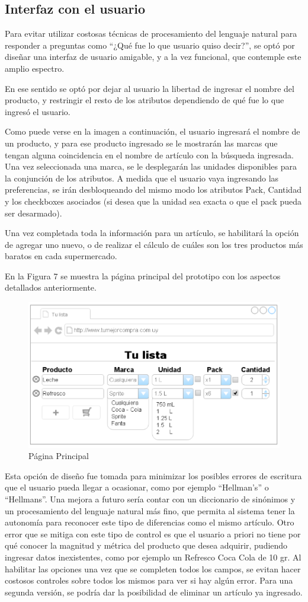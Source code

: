 \documentclass[12pt]{article} %
\begin{document}

\subsection{Interfaz con el usuario}
Para evitar utilizar costosas técnicas de procesamiento del lenguaje natural para responder a preguntas como “¿Qué fue lo que usuario quiso decir?”, se optó por diseñar una interfaz de usuario amigable, y a la vez funcional, que contemple este amplio espectro. 

En ese sentido se optó por dejar al usuario la libertad de ingresar el nombre del producto, y restringir el resto de los atributos dependiendo de qué fue lo que ingresó el usuario.

Como puede verse en la imagen a continuación, el usuario ingresará el nombre de un producto, y para ese producto ingresado se le mostrarán las marcas que tengan alguna coincidencia en el nombre de artículo con la búsqueda ingresada. Una vez seleccionada una marca, se le desplegarán las unidades disponibles para la conjunción de los atributos. A medida que el usuario vaya ingresando las preferencias, se irán desbloqueando del mismo modo los atributos Pack, Cantidad y los checkboxes asociados (si desea que la unidad sea exacta o que el pack pueda ser desarmado).

Una vez completada toda la información para un artículo, se habilitará la opción de agregar uno nuevo, o de realizar el cálculo de cuáles son los tres productos más baratos en cada supermercado.

En la Figura 7 se muestra la página principal del prototipo con los aspectos detallados anteriormente.

\begin{figure}[H]
\includegraphics[height=0.30\textwidth]{interfaz_usuario}
\centering
\caption{Página Principal}
\end{figure}

Esta opción de diseño fue tomada para minimizar los posibles errores de escritura que el usuario pueda llegar a ocasionar, como por ejemplo “Hellman’s” o “Hellmans”. Una mejora a futuro sería contar con un diccionario de sinónimos y un procesamiento del lenguaje natural más fino, que permita al sistema tener la autonomía para reconocer este tipo de diferencias como el mismo artículo. Otro error que se mitiga con este tipo de control es que el usuario a priori no tiene por qué conocer la magnitud y métrica del producto que desea adquirir, pudiendo ingresar datos inexistentes, como por ejemplo un Refresco Coca Cola de 10 gr. Al habilitar las opciones una vez que se completen todos los campos, se evitan hacer costosos controles sobre todos los mismos para ver si hay algún error. Para una segunda versión, se podría dar la posibilidad de eliminar un artículo ya ingresado.
\end{document}
